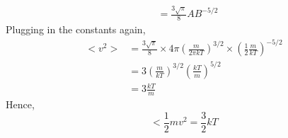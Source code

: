 \documentclass{article}
\begin{document}
\begin{itemize}
\begin{align*}
	&= \frac{3\sqrt{\pi}}{8}AB^{-5/2}
	\end{align*}
	Plugging in the constants again,
	\begin{align*}
	<v^2> &= \frac{3\sqrt{\pi}}{8}\times 4\pi\left(\frac{m}{2\pi kT}\right)^{3/2}\times \left(\frac{1}{2}\frac{m}{kT}\right)^{-5/2} \\
	&= 3\left(\frac{m}{kT}\right)^{3/2}\left(\frac{kT}{m}\right)^{5/2} \\
	&= 3\frac{kT}{m}
	\end{align*}
	Hence,
	\begin{equation}
	<\frac{1}{2}mv^2 = \frac{3}{2}kT
	\end{equation}
\end{itemize}
\end{document}
